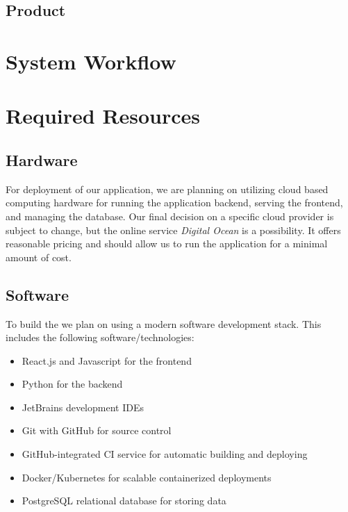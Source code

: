 \documentclass[12pt]{article}
\begin{document}
\subsection{Product}

\section{System Workflow}

\section{Required Resources}
\subsection{Hardware}
For deployment of our application, we are planning on utilizing cloud based computing hardware for
running the application backend, serving the frontend, and managing the database. Our final decision
on a specific cloud provider is subject to change, but the online service \textit{Digital Ocean} is
a possibility. It offers reasonable pricing and should allow us to run the application for a minimal
amount of cost.

\subsection{Software}
To build the we plan on using a modern software development stack. This includes the following
software/technologies:

\begin{itemize}
    \item React.js and Javascript for the frontend
    \item Python for the backend
    \item JetBrains development IDEs
    \item Git with GitHub for source control
    \item GitHub-integrated CI service for automatic building and deploying
    \item Docker/Kubernetes for scalable containerized deployments
    \item PostgreSQL relational database for storing data
\end{itemize}
\end{document}
